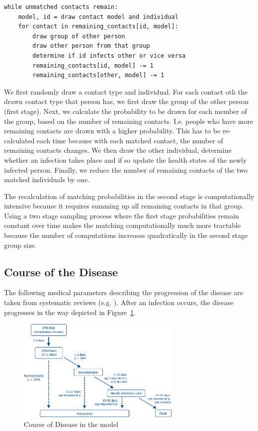 \begin{lstlisting}
while unmatched contacts remain:
    model, id = draw contact model and individual
    for contact in remaining_contacts[id, model]:
        draw group of other person
        draw other person from that group
        determine if id infects other or vice versa
        remaining_contacts[id, model] -= 1
        remaining_contacts[other, model] -= 1
\end{lstlisting}


We first randomly draw a contact type and individual. For each contact oth the drawn contact type that person has, we first draw the group of the other person (first stage). Next, we calculate the probability to be drawn for each member of the group, based on the number of remaining contacts. I.e. people who have more remaining contacts are drawn with a higher probability. This has to be re-calculated each time because with each matched contact, the number of remaining contacts changes. We then draw the other individual, determine whether an infection takes place and if so update the health states of the newly infected person. Finally, we reduce the number of remaining contacts of the two matched individuals by one.

The recalculation of matching probabilities in the second stage is computationally intensive because it requires summing up all remaining contacts in that group. Using a two stage sampling process where the first stage probabilities remain constant over time makes the matching computationally much more tractable because the number of computations increases quadratically in the second stage group size.

\FloatBarrier


\subsection{Course of the Disease}

The following medical parameters describing the progression of the disease are taken from systematic reviews (e.g. \cite{He2020}). After an infection occurs, the disease progresses in the way depicted in Figure~\ref{fig:course_of_disease}.

\begin{figure}[!ht]
    \includegraphics[width=0.7\textwidth]{../figures/disease_progression.png}
    \caption{Course of Disease in the model}
    \label{fig:course_of_disease}
\end{figure}

